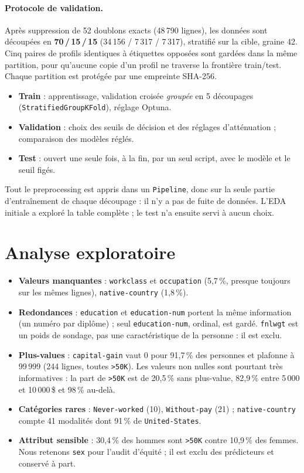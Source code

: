 \documentclass[11pt,a4paper]{article}
\begin{document}
\paragraph{Protocole de validation.} Après suppression de 52 doublons exacts (48\,790 lignes), les données sont découpées en \textbf{70\,/\,15\,/\,15} (34\,156 / 7\,317 / 7\,317), stratifié sur la cible, graine 42. Cinq paires de profils identiques à étiquettes opposées sont gardées dans la même partition, pour qu'aucune copie d'un profil ne traverse la frontière train/test. Chaque partition est protégée par une empreinte SHA-256.
\begin{itemize}
\item \textbf{Train} : apprentissage, validation croisée \emph{groupée} en 5 découpages (\texttt{StratifiedGroupKFold}), réglage Optuna.
\item \textbf{Validation} : choix des seuils de décision et des réglages d'atténuation ; comparaison des modèles réglés.
\item \textbf{Test} : ouvert une seule fois, à la fin, par un seul script, avec le modèle et le seuil figés.
\end{itemize}
Tout le preprocessing est appris dans un \texttt{Pipeline}, donc sur la seule partie d'entraînement de chaque découpage : il n'y a pas de fuite de données. L'EDA initiale a exploré la table complète ; le test n'a ensuite servi à aucun choix.

\section{Analyse exploratoire}

\begin{itemize}
\item \textbf{Valeurs manquantes} : \texttt{workclass} et \texttt{occupation} (5,7\,\%, presque toujours sur les mêmes lignes), \texttt{native-country} (1,8\,\%).
\item \textbf{Redondances} : \texttt{education} et \texttt{education-num} portent la même information (un numéro par diplôme) ; seul \texttt{education-num}, ordinal, est gardé. \texttt{fnlwgt} est un poids de sondage, pas une caractéristique de la personne : il est exclu.
\item \textbf{Plus-values} : \texttt{capital-gain} vaut 0 pour 91,7\,\% des personnes et plafonne à 99\,999 (244 lignes, toutes \texttt{>50K}). Les valeurs non nulles sont pourtant très informatives : la part de \texttt{>50K} est de 20,5\,\% sans plus-value, 82,9\,\% entre 5\,000 et 10\,000\,\$ et 98\,\% au-delà.
\item \textbf{Catégories rares} : \texttt{Never-worked} (10), \texttt{Without-pay} (21) ; \texttt{native-country} compte 41 modalités dont 91\,\% de \texttt{United-States}.
\item \textbf{Attribut sensible} : 30,4\,\% des hommes sont \texttt{>50K} contre 10,9\,\% des femmes. Nous retenons \texttt{sex} pour l'audit d'équité ; il est exclu des prédicteurs et conservé à part.
\end{itemize}
\end{document}
